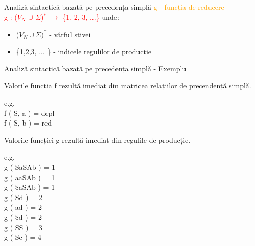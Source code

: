 \documentclass[pdf]{beamer}
\begin{document}
\begin{frame}{Analiză sintactică bazată pe precedența simplă}
\textcolor{orange}{g - funcția de reducere}\\

\textcolor{red}{g : ($V_{N}$ $\cup$ $\Sigma$)$^*$ $\rightarrow$ \{1, 2, 3, ...\}\;} unde:\\
\begin{itemize}
\item
($V_{N} \cup \Sigma)^*$  -  vârful stivei\;

\item
\{1,2,3, ... \} - indicele regulilor de producție\;
\end{itemize}


\end{frame}



\begin{frame}{Analiză sintactică bazată pe precedența simplă - Exemplu}

Valorile funcția f rezultă imediat din matricea relațiilor de precendență simplă.

e.g.\\
f ( S, a ) = depl\\
f ( S, b ) = red
\newline

Valorile funcției g rezultă imediat din regulile de producție.

e.g.\\
g ( SaSAb ) = 1\\
g ( aaSAb ) = 1\\
g ( \$aSAb ) = 1\\
g ( Sd ) = 2\\
g ( ad ) = 2\\
g ( \$d ) = 2\\
g ( SS ) = 3\\
g ( Sc ) = 4\\

\end{frame}
\end{document}
